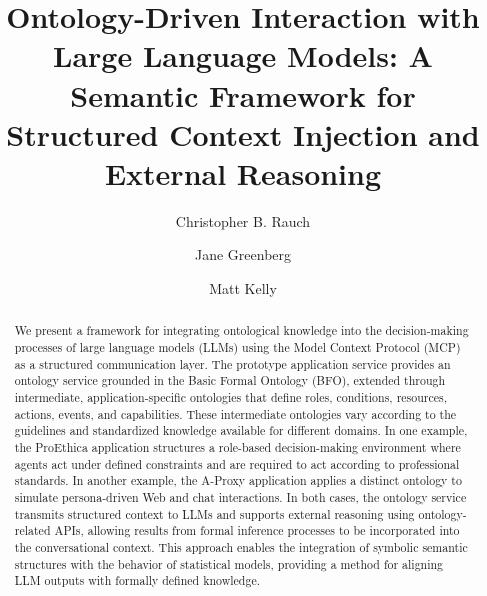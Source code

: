 \documentclass[sigconf,anonymous]{acmart}
\begin{document}
\title{Ontology-Driven Interaction with Large Language Models: A Semantic Framework for Structured Context Injection and External Reasoning}

\author{Christopher B. Rauch}

\author{Jane Greenberg}

\author{Matt Kelly}


\renewcommand{\shortauthors}{Rauch et al.}

\begin{abstract}
We present a framework for integrating ontological knowledge into the decision-making processes of large language models (LLMs) using the Model Context Protocol (MCP) as a structured communication layer. The prototype application service provides an ontology service grounded in the Basic Formal Ontology (BFO), extended through intermediate, application-specific ontologies that define roles, conditions, resources, actions, events, and capabilities. These intermediate ontologies vary according to the guidelines and standardized knowledge available for different domains. In one example, the ProEthica application structures a role-based decision-making environment where agents act under defined constraints and are required to act according to professional standards. In another example, the A-Proxy application applies a distinct ontology to simulate persona-driven Web and chat interactions. In both cases, the ontology service transmits structured context to LLMs and supports external reasoning using ontology-related APIs, allowing results from formal inference processes to be incorporated into the conversational context. This approach enables the integration of symbolic semantic structures with the behavior of statistical models, providing a method for aligning LLM outputs with formally defined knowledge.
\end{abstract}
\end{document}
